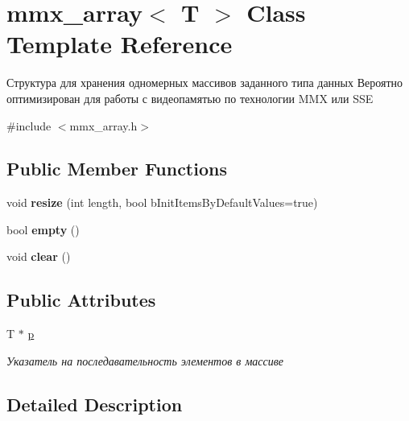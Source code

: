 \hypertarget{classmmx__array}{\section{mmx\+\_\+array$<$ T $>$ Class Template Reference}
\label{classmmx__array}
}


Структура для хранения одномерных массивов заданного типа данных Вероятно оптимизирован для работы с видеопамятью по технологии M\+M\+X или S\+S\+E  




{\ttfamily \#include $<$mmx\+\_\+array.\+h$>$}

\subsection*{Public Member Functions}
\begin{DoxyCompactItemize}
\item 
\hypertarget{classmmx__array_a1e2391d51dfe090e9bd0a9bd5368d512}{void {\bfseries resize} (int length, bool b\+Init\+Items\+By\+Default\+Values=true)}\label{classmmx__array_a1e2391d51dfe090e9bd0a9bd5368d512}

\item 
\hypertarget{classmmx__array_ad16d7bd1ebebc364a791f011d2d5f9d1}{bool {\bfseries empty} ()}\label{classmmx__array_ad16d7bd1ebebc364a791f011d2d5f9d1}

\item 
\hypertarget{classmmx__array_a5da7e05a539fbfb916289d32ae540a9e}{void {\bfseries clear} ()}\label{classmmx__array_a5da7e05a539fbfb916289d32ae540a9e}

\end{DoxyCompactItemize}
\subsection*{Public Attributes}
\begin{DoxyCompactItemize}
\item 
T $\ast$ \hyperlink{classmmx__array_ad960c2e84c1717258f9c9527b0d339b2}{p}
\begin{DoxyCompactList}\small\item\em Указатель на последавательность элементов в массиве \end{DoxyCompactList}\end{DoxyCompactItemize}


\subsection{Detailed Description}
